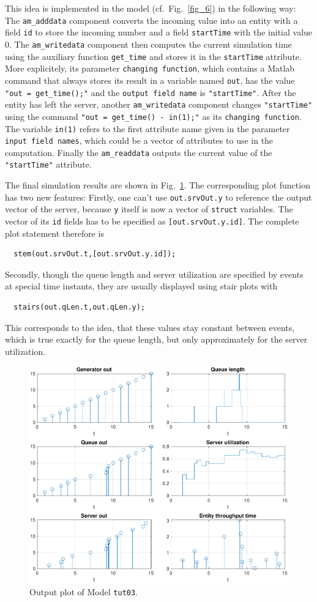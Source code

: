 \documentclass[12pt,oneside,a4paper,bibtotoc,BCOR=0pt,DIV=20]{scrreprt}
\newcommand{\cft}[1]{\mbox{\texttt{#1}}}   %
\begin{document}
This idea is implemented in the model (cf.\ Fig.\ \ref{fig_6}) in the following
way: The \cft{am\_adddata} component converts the incoming value into an entity
with a field \cft{id} to store the incoming number and a field \cft{startTime}
with the initial value $0$. The \cft{am\_writedata} component then computes the
current simulation time using the auxiliary function \cft{get\_time} and stores
it in the \cft{startTime} attribute. More explicitely, its parameter
\cft{changing function}, which contains a Matlab command that always stores its
result in a variable named \cft{out}, has the value \cft{"out = get\_time();"}
and the \cft{output field name} is \cft{"startTime"}. After the entity has left
the server, another \cft{am\_writedata} component changes \cft{"startTime"}
using the command \cft{"out = get\_time() - in(1);"} as its \cft{changing
  function}. The variable \cft{in(1)} refers to the first attribute name given
in the parameter \cft{input field names}, which could be a vector of attributes
to use in the computation. Finally the \cft{am\_readdata} outputs the current
value of the \cft{"startTime"} attribute.

The final simulation results are shown in Fig.\ \ref{fig_7}. The corresponding
plot function has two new features: Firstly, one can't use \cft{out.srvOut.y}
to reference the output vector of the server, because \cft{y} itself is now a
vector of \cft{struct} variables. The vector of its \cft{id} fields has to be
specified as \cft{[out.srvOut.y.id]}. The complete plot statement therefore is
\begin{verbatim}
  stem(out.srvOut.t,[out.srvOut.y.id]);
\end{verbatim}
Secondly, though the queue length and server utilization are specified by
events at special time instants, they are usually displayed using stair plots
with
\begin{verbatim}
  stairs(out.qLen.t,out.qLen.y);
\end{verbatim}
This corresponds to the idea, that these values stay constant between events,
which is true exactly for the queue length, but only approximately for the
server utilization.

\begin{figure}[ht]
\centering
\includegraphics[width=0.50\columnwidth]{images/bild07.pdf}
\caption{Output plot of Model \cft{tut03}.}
\label{fig_7}
\end{figure}
\end{document}
